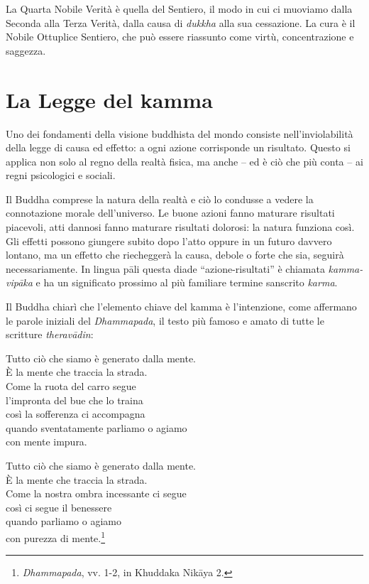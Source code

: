 La Quarta Nobile Verità è quella del Sentiero, il modo in cui ci
muoviamo dalla Seconda alla Terza Verità, dalla causa di \emph{dukkha}
alla sua cessazione. La cura è il Nobile Ottuplice Sentiero, che può
essere riassunto come virtù, concentrazione e saggezza.

\section{La Legge del kamma}

Uno dei fondamenti della visione buddhista del mondo consiste
nell'inviolabilità della legge di causa ed effetto: a ogni azione
corrisponde un risultato. Questo si applica non solo al regno della
realtà fisica, ma anche -- ed è ciò che più conta -- ai regni
psicologici e sociali.

Il Buddha comprese la natura della realtà e ciò lo condusse a vedere la
connotazione morale dell'universo. Le buone azioni fanno maturare
risultati piacevoli, atti dannosi fanno maturare risultati dolorosi: la
natura funziona così. Gli effetti possono giungere subito dopo l'atto
oppure in un futuro davvero lontano, ma un effetto che riecheggerà la
causa, debole o forte che sia, seguirà necessariamente. In lingua pāli
questa diade ``azione-risultati'' è chiamata \emph{kamma-vipāka} e ha un
significato prossimo al più familiare termine sanscrito \emph{karma}.

Il Buddha chiarì che l'elemento chiave del kamma è l'intenzione,
come affermano le parole iniziali del \emph{Dhammapada}, il testo più
famoso e amato di tutte le scritture \emph{theravādin}:

Tutto ciò che siamo è generato dalla mente.\\
È la mente che traccia la strada.\\
Come la ruota del carro segue\\
l'impronta del bue che lo traina\\
così la sofferenza ci accompagna\\
quando sventatamente parliamo o agiamo\\
con mente impura.

Tutto ciò che siamo è generato dalla mente.\\
È la mente che traccia la strada.\\
Come la nostra ombra incessante ci segue\\
così ci segue il benessere\\
quando parliamo o agiamo\\
con purezza di mente.\footnote{\emph{Dhammapada}, vv. 1-2, in
  Khuddaka Nikāya 2.}

